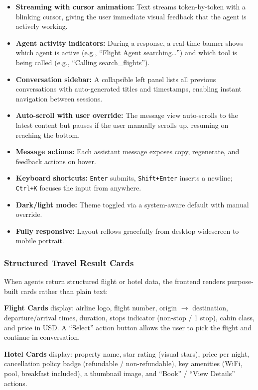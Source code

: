 \documentclass[12pt, a4paper]{article}
\begin{document}
\begin{itemize}[leftmargin=1.5cm, itemsep=0.3em]
  \item \textbf{Streaming with cursor animation:} Text streams token-by-token with a blinking cursor, giving the user immediate visual feedback that the agent is actively working.
  \item \textbf{Agent activity indicators:} During a response, a real-time banner shows which agent is active (e.g., ``Flight Agent searching\ldots'') and which tool is being called (e.g., ``Calling search\_flights'').
  \item \textbf{Conversation sidebar:} A collapsible left panel lists all previous conversations with auto-generated titles and timestamps, enabling instant navigation between sessions.
  \item \textbf{Auto-scroll with user override:} The message view auto-scrolls to the latest content but pauses if the user manually scrolls up, resuming on reaching the bottom.
  \item \textbf{Message actions:} Each assistant message exposes copy, regenerate, and feedback actions on hover.
  \item \textbf{Keyboard shortcuts:} \texttt{Enter} submits, \texttt{Shift+Enter} inserts a newline; \texttt{Ctrl+K} focuses the input from anywhere.
  \item \textbf{Dark/light mode:} Theme toggled via a system-aware default with manual override.
  \item \textbf{Fully responsive:} Layout reflows gracefully from desktop widescreen to mobile portrait.
\end{itemize}

\subsubsection{Structured Travel Result Cards}

When agents return structured flight or hotel data, the frontend renders purpose-built cards rather than plain text:

\textbf{Flight Cards} display: airline logo, flight number, origin $\to$ destination, departure/arrival times, duration, stops indicator (non-stop / 1 stop), cabin class, and price in USD. A ``Select'' action button allows the user to pick the flight and continue in conversation.

\textbf{Hotel Cards} display: property name, star rating (visual stars), price per night, cancellation policy badge (refundable / non-refundable), key amenities (WiFi, pool, breakfast included), a thumbnail image, and ``Book'' / ``View Details'' actions.
\end{document}
